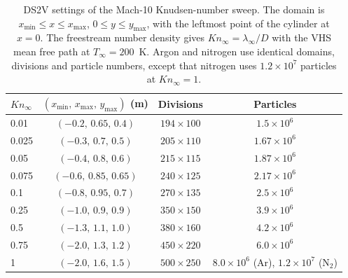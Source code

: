 \begin{table}
\centering
\caption{DS2V settings of the Mach-10 Knudsen-number sweep. The domain is
\(x_{\min}\leq x\leq x_{\max}\), \(0\leq y\leq y_{\max}\), with the leftmost
point of the cylinder at \(x=0\). The freestream number density gives
\(Kn_\infty=\lambda_\infty/D\) with the VHS mean free path at
\(T_\infty=200\)~K. Argon and nitrogen use identical domains, divisions and
particle numbers, except that nitrogen uses \(1.2\times10^{7}\) particles at
\(Kn_\infty=1\).}
\label{tab:ds2v_cases}
\begin{tabular}{lccc}
\toprule
\(Kn_\infty\) & \((x_{\min},\,x_{\max},\,y_{\max})\) (m) & Divisions & Particles\\
\midrule
0.01  & \((-0.2,\,0.65,\,0.4)\)  & \(194\times100\) & \(1.5\times10^{6}\)\\
0.025 & \((-0.3,\,0.7,\,0.5)\)   & \(205\times110\) & \(1.67\times10^{6}\)\\
0.05  & \((-0.4,\,0.8,\,0.6)\)   & \(215\times115\) & \(1.87\times10^{6}\)\\
0.075 & \((-0.6,\,0.85,\,0.65)\) & \(240\times125\) & \(2.17\times10^{6}\)\\
0.1   & \((-0.8,\,0.95,\,0.7)\)  & \(270\times135\) & \(2.5\times10^{6}\)\\
0.25  & \((-1.0,\,0.9,\,0.9)\)   & \(350\times150\) & \(3.9\times10^{6}\)\\
0.5   & \((-1.3,\,1.1,\,1.0)\)   & \(380\times160\) & \(4.2\times10^{6}\)\\
0.75  & \((-2.0,\,1.3,\,1.2)\)   & \(450\times220\) & \(6.0\times10^{6}\)\\
1     & \((-2.0,\,1.6,\,1.5)\)   & \(500\times250\) & \(8.0\times10^{6}\) (Ar), \(1.2\times10^{7}\) (N\(_2\))\\
\bottomrule
\end{tabular}
\end{table}
